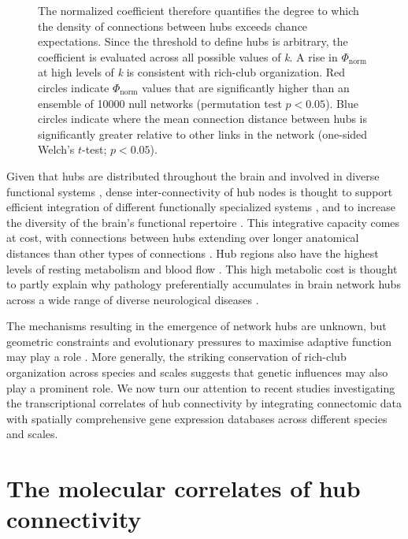 \begin{figure}[h!]
{The normalized coefficient therefore quantifies the degree to which the density of connections between hubs exceeds chance expectations. Since the threshold to define hubs is arbitrary, the coefficient is evaluated across all possible values of \textit{k}.
A rise in $\Phi_\mathrm{norm}$ at high levels of \textit{k} is consistent with rich-club organization. Red circles indicate $\Phi_\mathrm{norm}$ values that are significantly higher than an ensemble of \num{10000} null networks (permutation test $p < 0.05$).
Blue circles indicate where the mean connection distance between hubs is significantly greater relative to other links in the network (one-sided Welch’s $t$-test; $p < 0.05$). }
\label{fig:Ch3Fig2}
\end{figure}

Given that hubs are distributed throughout the brain and involved in diverse functional systems \citep{DeReus2013b,VandenHeuvel2013a,Fulcher2016}, dense inter-connectivity of hub nodes is thought to support efficient integration of different functionally specialized systems \citep{VandenHeuvel2012}, and to increase the diversity of the brain’s functional repertoire \citep{Senden2014}.
This integrative capacity comes at cost, with connections between hubs extending over longer anatomical distances than other types of connections \citep{VandenHeuvel2011,Harriger2012,Fulcher2016,Arnatkeviciute2018}.
Hub regions also have the highest levels of resting metabolism \citep{Vaishnavi2010,Tomasi2013} and blood flow \citep{Liang2013a}.
This high metabolic cost is thought to partly explain why pathology preferentially accumulates in brain network hubs across a wide range of diverse neurological diseases \citep{Bullmore2012,Crossley2014,Fornito2015}.

The mechanisms resulting in the emergence of network hubs are unknown, but geometric constraints and evolutionary pressures to maximise adaptive function may play a role \citep{Henderson2014,Roberts2016,Betzel2017}. More generally, the striking conservation of rich-club organization across species and scales suggests that genetic influences may also play a prominent role. We now turn our attention to recent studies investigating the transcriptional correlates of hub connectivity by integrating connectomic data with spatially comprehensive gene expression databases across different species and scales.

\section{The molecular correlates of hub connectivity}

